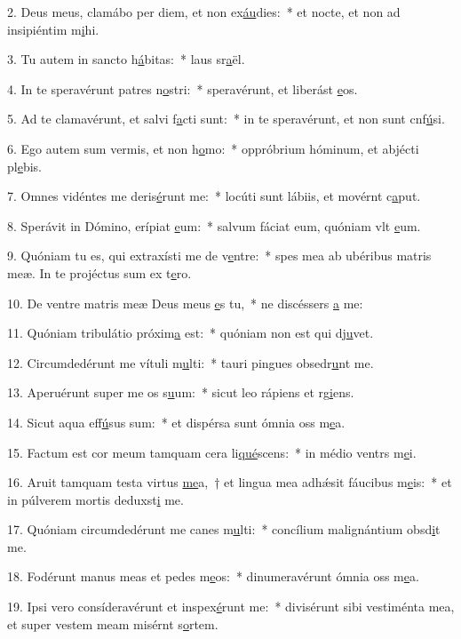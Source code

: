 2. Deus meus, clamábo per diem, et non ex\uline{áu}dies:~* et nocte, et non ad insipiéntim m\uline{i}hi.\par 
3. Tu autem in sancto h\uline{á}bitas:~* laus sr\uline{a}ël.\par 
4. In te speravérunt patres n\uline{o}stri:~* speravérunt, et liberást \uline{e}os.\par 
5. Ad te clamavérunt, et salvi f\uline{a}cti sunt:~* in te speravérunt, et non sunt cnf\uline{ú}si.\par 
6. Ego autem sum vermis, et non h\uline{o}mo:~* oppróbrium hóminum, et abjécti pl\uline{e}bis.\par 
7. Omnes vidéntes me deris\uline{é}runt me:~* locúti sunt lábiis, et movérnt c\uline{a}put.\par 
8. Sperávit in Dómino, erípiat \uline{e}um:~* salvum fáciat eum, quóniam vlt \uline{e}um.\par 
9. Quóniam tu es, qui extraxísti me de v\uline{e}ntre:~* spes mea ab ubéribus matris meæ. In te projéctus sum ex t\uline{e}ro.\par 
10. De ventre matris meæ Deus meus \uline{e}s tu,~* ne discéssers \uline{a} me:\par 
11. Quóniam tribulátio próxim\uline{a} est:~* quóniam non est qui dj\uline{u}vet.\par 
12. Circumdedérunt me vítuli m\uline{u}lti:~* tauri pingues obsedr\uline{u}nt me.\par 
13. Aperuérunt super me os s\uline{u}um:~* sicut leo rápiens et rg\uline{i}ens.\par 
14. Sicut aqua eff\uline{ú}sus sum:~* et dispérsa sunt ómnia oss m\uline{e}a.\par 
15. Factum est cor meum tamquam cera li\uline{qué}scens:~* in médio ventrs m\uline{e}i.\par 
16. Aruit tamquam testa virtus \uline{me}a,~† et lingua mea adhǽsit fáucibus m\uline{e}is:~* et in púlverem mortis deduxst\uline{i} me.\par 
17. Quóniam circumdedérunt me canes m\uline{u}lti:~* concílium malignántium obsd\uline{i}t me.\par 
18. Fodérunt manus meas et pedes m\uline{e}os:~* dinumeravérunt ómnia oss m\uline{e}a.\par 
19. Ipsi vero consíderavérunt et inspex\uline{é}runt me:~* divisérunt sibi vestiménta mea, et super vestem meam misérnt s\uline{o}rtem.\par 
